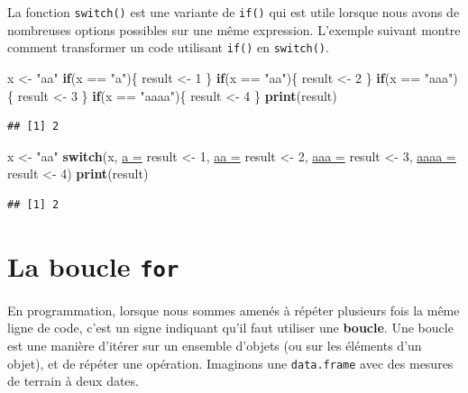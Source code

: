 \documentclass[twoside,symmetric]{book}
\newenvironment{Shaded}{}{}
\newcommand{\ControlFlowTok}[1]{\textbf{#1}}
\newcommand{\DataTypeTok}[1]{\underline{#1}}
\newcommand{\DecValTok}[1]{#1}
\newcommand{\KeywordTok}[1]{\textbf{#1}}
\newcommand{\NormalTok}[1]{#1}
\newcommand{\OperatorTok}[1]{#1}
\newcommand{\StringTok}[1]{#1}
\begin{document}
La fonction \texttt{switch()} est une variante de \texttt{if()} qui est utile lorsque nous avons de nombreuses options possibles sur une même expression. L'exemple suivant montre comment transformer un code utilisant \texttt{if()} en \texttt{switch()}.

\begin{Shaded}
\begin{Highlighting}[]
\NormalTok{x <-}\StringTok{ "aa"}
\ControlFlowTok{if}\NormalTok{(x }\OperatorTok{==}\StringTok{ "a"}\NormalTok{)\{}
\NormalTok{  result <-}\StringTok{ }\DecValTok{1}
\NormalTok{\}}
\ControlFlowTok{if}\NormalTok{(x }\OperatorTok{==}\StringTok{ "aa"}\NormalTok{)\{}
\NormalTok{  result <-}\StringTok{ }\DecValTok{2}
\NormalTok{\}}
\ControlFlowTok{if}\NormalTok{(x }\OperatorTok{==}\StringTok{ "aaa"}\NormalTok{)\{}
\NormalTok{  result <-}\StringTok{ }\DecValTok{3}
\NormalTok{\}}
\ControlFlowTok{if}\NormalTok{(x }\OperatorTok{==}\StringTok{ "aaaa"}\NormalTok{)\{}
\NormalTok{  result <-}\StringTok{ }\DecValTok{4}
\NormalTok{\}}
\KeywordTok{print}\NormalTok{(result)}
\end{Highlighting}
\end{Shaded}

\begin{verbatim}
## [1] 2
\end{verbatim}

\begin{Shaded}
\begin{Highlighting}[]
\NormalTok{x <-}\StringTok{ "aa"}
\ControlFlowTok{switch}\NormalTok{(x, }
  \DataTypeTok{a =}\NormalTok{ result <-}\StringTok{ }\DecValTok{1}\NormalTok{,}
  \DataTypeTok{aa =}\NormalTok{ result <-}\StringTok{ }\DecValTok{2}\NormalTok{,}
  \DataTypeTok{aaa =}\NormalTok{ result <-}\StringTok{ }\DecValTok{3}\NormalTok{,}
  \DataTypeTok{aaaa =}\NormalTok{ result <-}\StringTok{ }\DecValTok{4}\NormalTok{)}
\KeywordTok{print}\NormalTok{(result)}
\end{Highlighting}
\end{Shaded}

\begin{verbatim}
## [1] 2
\end{verbatim}

\hypertarget{l17for}{%
\section{\texorpdfstring{La boucle \texttt{for}}{La boucle for}}\label{l17for}}

En programmation, lorsque nous sommes amenés à répéter plusieurs fois la même ligne de code, c'est un signe indiquant qu'il faut utiliser une \textbf{boucle}. Une boucle est une manière d'itérer sur un ensemble d'objets (ou sur les éléments d'un objet), et de répéter une opération. Imaginons une \texttt{data.frame} avec des mesures de terrain à deux dates.
\end{document}

